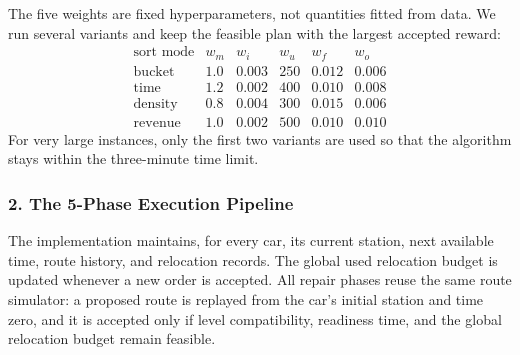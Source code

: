 \documentclass[10pt,a4paper]{article}
\begin{document}
The five weights are fixed hyperparameters, not quantities fitted from data.
We run several variants and keep the feasible plan with the largest accepted
reward:
\[
\begin{array}{c|ccccc}
\text{sort mode} & w_m & w_i & w_u & w_f & w_o\\
\hline
\text{bucket} & 1.0 & 0.003 & 250 & 0.012 & 0.006\\
\text{time} & 1.2 & 0.002 & 400 & 0.010 & 0.008\\
\text{density} & 0.8 & 0.004 & 300 & 0.015 & 0.006\\
\text{revenue} & 1.0 & 0.002 & 500 & 0.010 & 0.010
\end{array}
\]
For very large instances, only the first two variants are used so that the
algorithm stays within the three-minute time limit.

\subsubsection*{2. The 5-Phase Execution Pipeline}

The implementation maintains, for every car, its current station, next available
time, route history, and relocation records.  The global used relocation budget
is updated whenever a new order is accepted.  All repair phases reuse the same
route simulator: a proposed route is replayed from the car's initial station and
time zero, and it is accepted only if level compatibility, readiness time, and
the global relocation budget remain feasible.
\end{document}
